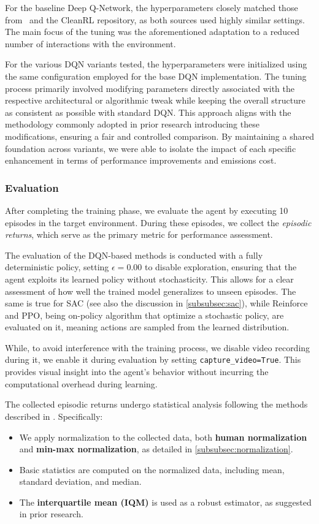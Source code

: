 For the baseline Deep Q-Network, the hyperparameters closely matched those from~\cite{mnih:human} and the CleanRL repository, as both sources used highly similar settings. The main focus of the tuning was the aforementioned adaptation to a reduced number of interactions with the environment.

For the various DQN variants tested, the hyperparameters were initialized using the same configuration employed for the base DQN implementation. The tuning process primarily involved modifying parameters directly associated with the respective architectural or algorithmic tweak while keeping the overall structure as consistent as possible with standard DQN. This approach aligns with the methodology commonly adopted in prior research introducing these modifications, ensuring a fair and controlled comparison. By maintaining a shared foundation across variants, we were able to isolate the impact of each specific enhancement in terms of performance improvements and emissions cost.

\subsubsection{Evaluation}

After completing the training phase, we evaluate the agent by executing \num{10} episodes in the target environment. During these episodes, we collect the \textit{episodic returns}, which serve as the primary metric for performance assessment.

The evaluation of the DQN-based methods is conducted with a fully deterministic policy, setting $\epsilon = 0.00$ to disable exploration, ensuring that the agent exploits its learned policy without stochasticity. This allows for a clear assessment of how well the trained model generalizes to unseen episodes. The same is true for SAC (see also the discussion in \ref{subsubsec:sac}), while Reinforce and PPO, being on-policy algorithm that optimize a stochastic policy, are evaluated on it, meaning actions are sampled from the learned distribution.

While, to avoid interference with the training process, we disable video recording during it, we enable it during evaluation by setting \texttt{capture\_video=True}. This provides visual insight into the agent's behavior without incurring the computational overhead during learning.

The collected episodic returns undergo statistical analysis following the methods described in . Specifically:
\begin{itemize}
	\item We apply normalization to the collected data, both \textbf{human normalization} and \textbf{min-max normalization}, as detailed in \ref{subsubsec:normalization}.
	\item Basic statistics are computed on the normalized data, including mean, standard deviation, and median.
	\item The \textbf{interquartile mean (IQM)} is used as a robust estimator, as suggested in prior research.

\end{itemize}

